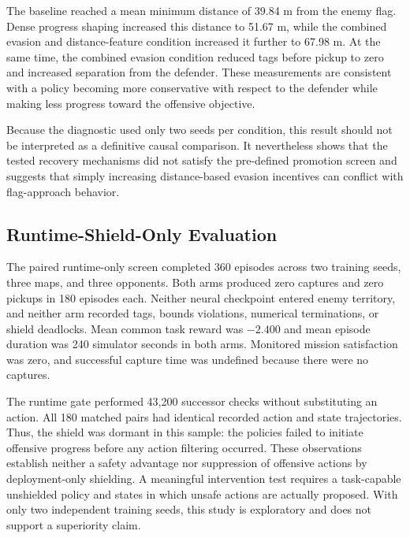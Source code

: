 \documentclass[letterpaper]{article}
\begin{document}
The baseline reached a mean minimum distance of 39.84 m from the enemy flag. Dense progress shaping increased this distance to 51.67 m, while the combined evasion and distance-feature condition increased it further to 67.98 m. At the same time, the combined evasion condition reduced tags before pickup to zero and increased separation from the defender. These measurements are consistent with a policy becoming more conservative with respect to the defender while making less progress toward the offensive objective.

Because the diagnostic used only two seeds per condition, this result should not be interpreted as a definitive causal comparison. It nevertheless shows that the tested recovery mechanisms did not satisfy the pre-defined promotion screen and suggests that simply increasing distance-based evasion incentives can conflict with flag-approach behavior.

\subsection{Runtime-Shield-Only Evaluation}

The paired runtime-only screen completed 360 episodes across two training seeds, three maps, and three opponents. Both arms produced zero captures and zero pickups in 180 episodes each. Neither neural checkpoint entered enemy territory, and neither arm recorded tags, bounds violations, numerical terminations, or shield deadlocks. Mean common task reward was $-2.400$ and mean episode duration was 240 simulator seconds in both arms. Monitored mission satisfaction was zero, and successful capture time was undefined because there were no captures.

The runtime gate performed 43,200 successor checks without substituting an action. All 180 matched pairs had identical recorded action and state trajectories. Thus, the shield was dormant in this sample: the policies failed to initiate offensive progress before any action filtering occurred. These observations establish neither a safety advantage nor suppression of offensive actions by deployment-only shielding. A meaningful intervention test requires a task-capable unshielded policy and states in which unsafe actions are actually proposed. With only two independent training seeds, this study is exploratory and does not support a superiority claim.
\end{document}
